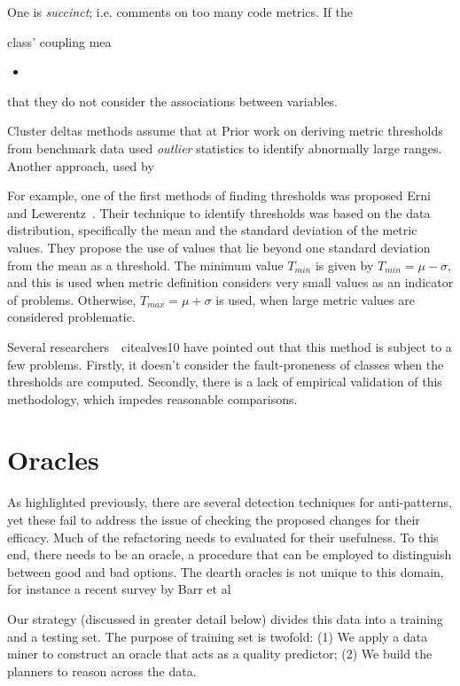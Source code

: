 \documentclass{sig-alternate}
\begin{document}
One is {\em succinct}; i.e. comments
on too many code metrics. If the 

class' coupling mea
\begin{itemize}
    \item 
\end{itemize}that they do not consider the associations
between variables.

Cluster deltas methods assume that at
Prior work on deriving metric thresholds from benchmark data
used {\em outlier} statistics to identify abnormally large ranges. 
Another approach, used by 



For example,
one of the first methods of finding thresholds was proposed Erni and Lewerentz~\cite{erni96}. Their technique to identify thresholds was based on the data distribution, specifically the mean and the standard deviation of the metric values. They propose the use of values that lie beyond one standard deviation from the mean as a threshold. The minimum value $T_{min}$ is given by $T_{min}=\mu-\sigma$, and this is used when metric definition considers very small values as an indicator of problems. Otherwise, $T_{max}=\mu+\sigma$ is used, when large metric values are considered problematic.

Several researchers~\cite{shatnawi10}~cite{alves10} have pointed out that this method is subject to a few problems. Firstly, it doesn't consider the fault-proneness of classes when the thresholds are computed. Secondly, there is a lack of empirical validation of this methodology, which impedes reasonable comparisons.



\section{Oracles}
\label{sect:eval}


As highlighted previously, there are several detection techniques for anti-patterns, yet these fail to address the issue of checking the proposed changes for their efficacy. Much of the refactoring needs to evaluated for their usefulness. To this end, there needs to be an oracle, a procedure that can be employed to distinguish between good and bad options. The dearth oracles is not unique to this domain, for instance a recent survey by Barr et al \cite{barr15}

Our strategy (discussed in greater detail below) divides this data into a training and a testing set. The purpose of training set is twofold: (1) We apply a data miner to construct an oracle that acts as a quality predictor; (2) We build the planners to reason across the data. 
\end{document}
